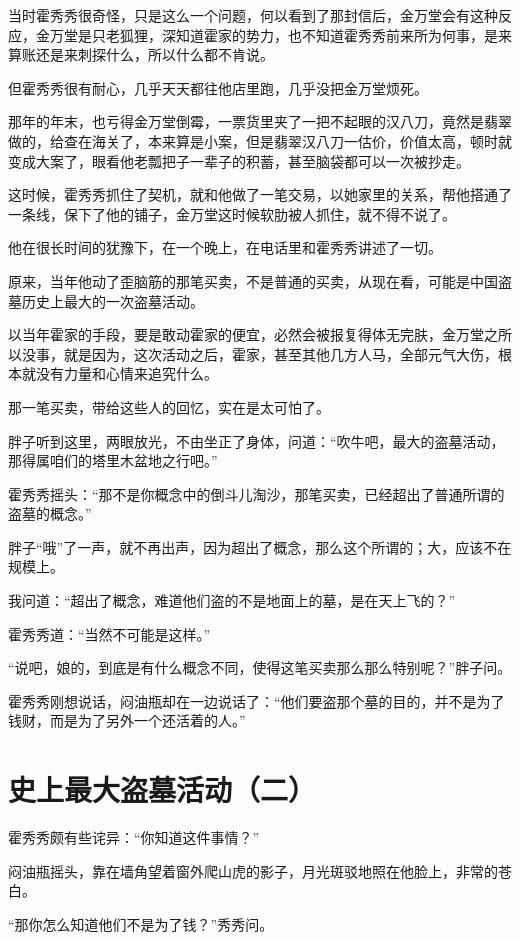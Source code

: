 当时霍秀秀很奇怪，只是这么一个问题，何以看到了那封信后，金万堂会有这种反应，金万堂是只老狐狸，深知道霍家的势力，也不知道霍秀秀前来所为何事，是来算账还是来刺探什么，所以什么都不肯说。

但霍秀秀很有耐心，几乎天天都往他店里跑，几乎没把金万堂烦死。

那年的年末，也亏得金万堂倒霉，一票货里夹了一把不起眼的汉八刀，竟然是翡翠做的，给查在海关了，本来算是小案，但是翡翠汉八刀一估价，价值太高，顿时就变成大案了，眼看他老瓢把子一辈子的积蓄，甚至脑袋都可以一次被抄走。

这时候，霍秀秀抓住了契机，就和他做了一笔交易，以她家里的关系，帮他搭通了一条线，保下了他的铺子，金万堂这时候软肋被人抓住，就不得不说了。

他在很长时间的犹豫下，在一个晚上，在电话里和霍秀秀讲述了一切。

原来，当年他动了歪脑筋的那笔买卖，不是普通的买卖，从现在看，可能是中国盗墓历史上最大的一次盗墓活动。

以当年霍家的手段，要是敢动霍家的便宜，必然会被报复得体无完肤，金万堂之所以没事，就是因为，这次活动之后，霍家，甚至其他几方人马，全部元气大伤，根本就没有力量和心情来追究什么。

那一笔买卖，带给这些人的回忆，实在是太可怕了。

胖子听到这里，两眼放光，不由坐正了身体，问道：“吹牛吧，最大的盗墓活动，那得属咱们的塔里木盆地之行吧。”

霍秀秀摇头：“那不是你概念中的倒斗儿淘沙，那笔买卖，已经超出了普通所谓的盗墓的概念。”

胖子“哦”了一声，就不再出声，因为超出了概念，那么这个所谓的；大，应该不在规模上。

我问道：“超出了概念，难道他们盗的不是地面上的墓，是在天上飞的？”

霍秀秀道：“当然不可能是这样。”

“说吧，娘的，到底是有什么概念不同，使得这笔买卖那么那么特别呢？”胖子问。

霍秀秀刚想说话，闷油瓶却在一边说话了：“他们要盗那个墓的目的，并不是为了钱财，而是为了另外一个还活着的人。”

\chapter{史上最大盗墓活动（二）}

霍秀秀颇有些诧异：“你知道这件事情？”

闷油瓶摇头，靠在墙角望着窗外爬山虎的影子，月光斑驳地照在他脸上，非常的苍白。

“那你怎么知道他们不是为了钱？”秀秀问。

